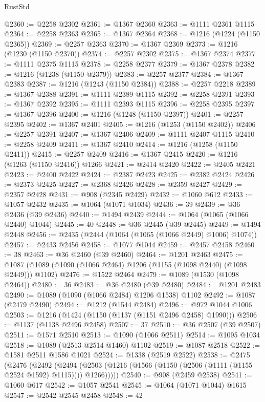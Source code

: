 \begin{lexlean}{RustStd}
\begin{coremodule}
@2360 := @2258 @2302
@2361 := @1367 @2360
@2363 := @1111 @2361 @1115
@2364 := @2258 @2363
@2365 := @1367 @2364
@2368 := @1216 (@1224 (@1150 @2365))
@2369 := @2257 @2363
@2370 := @1367 @2369
@2373 := @1216 (@1230 (@1150 @2370))
@2374 := @2257 @2302
@2375 := @1367 @2374
@2377 := @1111 @2375 @1115
@2378 := @2258 @2377
@2379 := @1367 @2378
@2382 := @1216 (@1238 (@1150 @2379))
@2383 := @2257 @2377
@2384 := @1367 @2383
@2387 := @1216 (@1243 (@1150 @2384))
@2388 := @2257 @2218
@2389 := @1367 @2388
@2391 := @1111 @2389 @1115
@2392 := @2258 @2391
@2393 := @1367 @2392
@2395 := @1111 @2393 @1115
@2396 := @2258 @2395
@2397 := @1367 @2396
@2400 := @1216 (@1248 (@1150 @2397))
@2401 := @2257 @2395
@2402 := @1367 @2401
@2405 := @1216 (@1253 (@1150 @2402))
@2406 := @2257 @2391
@2407 := @1367 @2406
@2409 := @1111 @2407 @1115
@2410 := @2258 @2409
@2411 := @1367 @2410
@2414 := @1216 (@1258 (@1150 @2411))
@2415 := @2257 @2409
@2416 := @1367 @2415
@2420 := @1216 (@1263 (@1150 @2416)) @1266
@2421 := @2414 @2420
@2422 := @2405 @2421
@2423 := @2400 @2422
@2424 := @2387 @2423
@2425 := @2382 @2424
@2426 := @2373 @2425
@2427 := @2368 @2426
@2428 := @2359 @2427
@2429 := @2357 @2428
@2431 := @908 (@2345 @2429)
@2432 := @1060 @612
@2433 := @1057 @2432
@2435 := @1064 (@1071 @1034)
@2436 := 39
@2439 := @36 @2436 (@39 @2436)
@2440 := @1494 @2439
@2444 := @1064 (@1065 (@1066 @2440) @1044)
@2445 := 40
@2448 := @36 @2445 (@39 @2445)
@2449 := @1494 @2448
@2456 := @2435 (@2444 (@1064 (@1065 (@1066 @2449) @1006) @1074))
@2457 := @2433 @2456
@2458 := @1077 @1044
@2459 := @2457 @2458
@2460 := 38
@2463 := @36 @2460 (@39 @2460)
@2464 := @1201 @2463
@2475 := @1087 (@1089 (@1090 (@1066 @2464) @1206 (@1155 (@1098 @2440) (@1098 @2449))) @1102)
@2476 := @1522 @2464
@2479 := @1089 (@1530 (@1098 @2464))
@2480 := 36
@2483 := @36 @2480 (@39 @2480)
@2484 := @1201 @2483
@2490 := @1089 (@1090 (@1066 @2484) @1206 @1538) @1102
@2492 := @1087 (@2479 @2490)
@2494 := @1212 (@1544 @2484)
@2496 := @972 @1044 @1006
@2503 := @1216 (@1424 (@1150 (@1137 (@1151 @2496 @2458) @1990)))
@2506 := @1137 (@1138 @2496 @2458)
@2507 := 37
@2510 := @36 @2507 (@39 @2507)
@2511 := @1571 @2510
@2513 := @1090 (@1066 @2511)
@2514 := @1095 @1034
@2518 := @1089 (@2513 @2514 @1460) @1102
@2519 := @1087 @2518
@2522 := @1581 @2511 @1586 @1021
@2524 := @1338 (@2519 @2522)
@2538 := @2475
    (@2476
      (@2492
        (@2494 (@2503 (@1216 (@1566 (@1150 (@2506 (@1111 (@1155 @2524 @1592) @1115)))) @1266)))))
@2540 := @908 (@2459 @2538)
@2541 := @1060 @617
@2542 := @1057 @2541
@2545 := @1064 (@1071 @1044) @1615
@2547 := @2542 @2545 @2458
@2548 := 42

\end{coremodule}
\end{lexlean}
